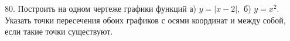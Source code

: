 80. Построить на одном чертеже графики функций а) $y=|x-2|,$ б) $y=x^2.$\\
Указать точки пересечения обоих графиков с осями координат и между собой, если такие точки существуют.\\
